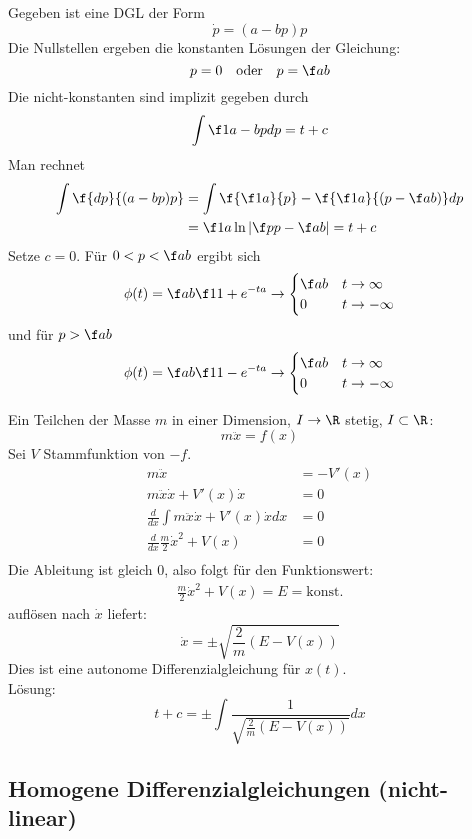 \documentclass[a4paper,10pt]{scrbook}
\begin{document}
\begin{ex*}
	Gegeben ist eine DGL der Form
	\[
		\dot p = (a-bp)p
	\]
	Die Nullstellen ergeben die konstanten Lösungen der Gleichung:
	\[
		p = 0 \quad \text{oder} \quad p = \f ab
	\]
	Die nicht-konstanten sind implizit gegeben durch
	\[
		\int \f 1{a-bp}dp = t +c
	\]
	Man rechnet
	\begin{align*}
		\int \f {dp}{(a-bp)p} &= \int \f {\f 1a}{p} - \f {\f 1a}{(p-\f ab)}dp\\
							  &= \f 1a \ln \left| \f p{p-\f ab}\right| = t +c
	\end{align*}
	Setze $c=0$.
	Für $0<p<\f ab$ ergibt sich
	\[
		\phi(t) = \f ab \f 1{1+e^{-ta}} \to \begin{cases} \f ab & t\to \infty \\ 0 & t\to -\infty\end{cases}
	\]
	und für $p> \f ab$
	\[
		\phi(t) = \f ab \f 1{1-e^{-ta}} \to \begin{cases}\f ab & t \to \infty\\0 & t\to -\infty\end{cases}
	\]
\end{ex*}

\begin{ex*}

Ein Teilchen der Masse $m$ in einer Dimension, $I\to \R$ stetig, $I\subset \R$:
\[
m\ddot x=f(x)
\]
Sei $V$ Stammfunktion von $-f$.
\begin{align*}
m\ddot x &= -V'(x) \\
m\ddot x \dot x + V'(x)\dot x &= 0 \\
\frac d{dx} \int m \ddot x\dot x + V'(x)\dot xdx &= 0\\
\frac d{dx} \frac m2 \dot x^2 + V(x) &= 0\\
\end{align*}
Die Ableitung ist gleich $0$, also folgt für den Funktionswert:
\begin{align*}
\frac m2 \dot x^2 + V(x) = E = \text{konst.}
\end{align*}
auflösen nach $\dot x$ liefert:
\[
\dot x = \pm\sqrt{\frac 2m (E-V(x))}
\]
Dies ist eine autonome Differenzialgleichung für $x(t)$.\\
Lösung:\\
\[
t+c = \pm \int \frac{1}{\sqrt{\frac{2}{m}(E-V(x))}}dx
\]
\end{ex*}


\subsection{Homogene Differenzialgleichungen (nicht-linear)}
\end{document}
